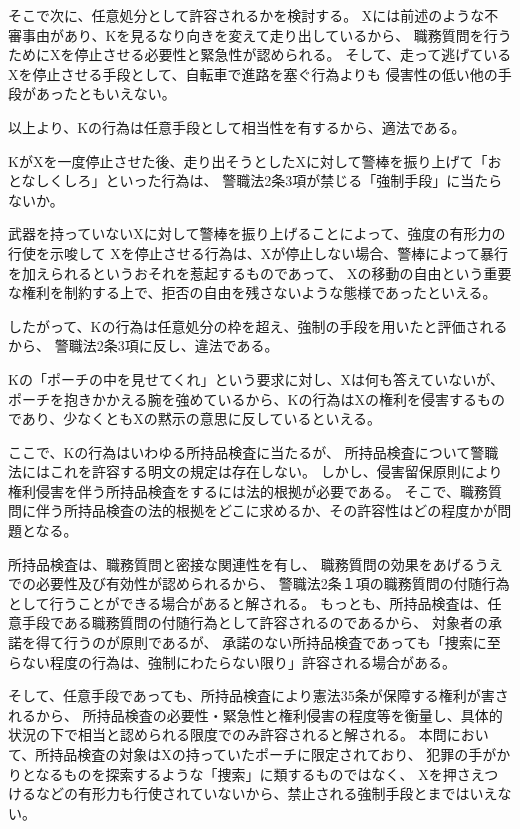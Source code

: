\documentclass[11pt]{jsarticle}
\begin{document}
			そこで次に、任意処分として許容されるかを検討する。
			Xには前述のような不審事由があり、Kを見るなり向きを変えて走り出しているから、
			職務質問を行うためにXを停止させる必要性と緊急性が認められる。
			そして、走って逃げているXを停止させる手段として、自転車で進路を塞ぐ行為よりも
			侵害性の低い他の手段があったともいえない。
		
	\sectionB{}
		以上より、Kの行為は任意手段として相当性を有するから、適法である。
		
			
	KがXを一度停止させた後、走り出そうとしたXに対して警棒を振り上げて「おとなしくしろ」といった行為は、
	警職法2条3項が禁じる「強制手段」に当たらないか。
	
	武器を持っていないXに対して警棒を振り上げることによって、強度の有形力の行使を示唆して
	Xを停止させる行為は、Xが停止しない場合、警棒によって暴行を加えられるというおそれを惹起するものであって、
	Xの移動の自由という重要な権利を制約する上で、拒否の自由を残さないような態様であったといえる。
	
	したがって、Kの行為は任意処分の枠を超え、強制の手段を用いたと評価されるから、
	警職法2条3項に反し、違法である。

	\sectionB{}
		Kの「ポーチの中を見せてくれ」という要求に対し、Xは何も答えていないが、
		ポーチを抱きかかえる腕を強めているから、Kの行為はXの権利を侵害するものであり、少なくともXの黙示の意思に反しているといえる。
		
		ここで、Kの行為はいわゆる所持品検査に当たるが、
		所持品検査について警職法にはこれを許容する明文の規定は存在しない。
		しかし、侵害留保原則により権利侵害を伴う所持品検査をするには法的根拠が必要である。
		そこで、職務質問に伴う所持品検査の法的根拠をどこに求めるか、その許容性はどの程度かが問題となる。
		
			所持品検査は、職務質問と密接な関連性を有し、
			職務質問の効果をあげるうえでの必要性及び有効性が認められるから、
			警職法2条１項の職務質問の付随行為として行うことができる場合があると解される。
			もっとも、所持品検査は、任意手段である職務質問の付随行為として許容されるのであるから、
			対象者の承諾を得て行うのが原則であるが、
			承諾のない所持品検査であっても「捜索に至らない程度の行為は、強制にわたらない限り」許容される場合がある。

			そして、任意手段であっても、所持品検査により憲法35条が保障する権利が害されるから、
			所持品検査の必要性・緊急性と権利侵害の程度等を衡量し、具体的状況の下で相当と認められる限度でのみ許容されると解される。
		\sectionC{}
			本問において、所持品検査の対象はXの持っていたポーチに限定されており、
			犯罪の手がかりとなるものを探索するような「捜索」に類するものではなく、
			Xを押さえつけるなどの有形力も行使されていないから、禁止される強制手段とまではいえない。
			
\end{document}

